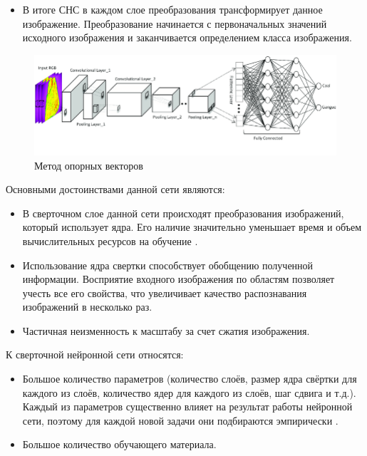 \begin{itemize}
	\item В итоге СНС в каждом слое преобразования трансформирует данное изображение. Преобразование начинается с первоначальных значений исходного изображения и заканчивается определением класса изображения.
\end{itemize}

\captionsetup{justification=centering,singlelinecheck=off}
\begin{figure}[h!]
	\centering
		\includegraphics[pages=-, scale=0.5]{img/CNN.png}
		\caption{Метод опорных векторов}  
\end{figure}

Основными достоинствами данной сети являются:
\begin{itemize}
	\item В сверточном слое данной сети происходят преобразования изображений, который использует ядра. Его наличие значительно уменьшает время и объем вычислительных ресурсов на обучение \cite{neronnetwork12}.
	\item Использование ядра свертки способствует обобщению полученной информации. Восприятие входного изображения по областям позволяет учесть все его свойства, что увеличивает качество распознавания изображений в несколько раз.
	\item Частичная неизменность к масштабу за счет сжатия изображения.
\end{itemize}

К  сверточной нейронной сети относятся:
\begin{itemize}
	\item Большое количество параметров (количество слоёв, размер ядра свёртки для каждого из слоёв, количество ядер для каждого из слоёв, шаг сдвига и т.д.). Каждый из параметров существенно влияет на результат работы нейронной сети, поэтому для каждой новой задачи они подбираются эмпирически \cite{neronnetwork13}.
	\item Большое количество обучающего материала.
\end{itemize}

